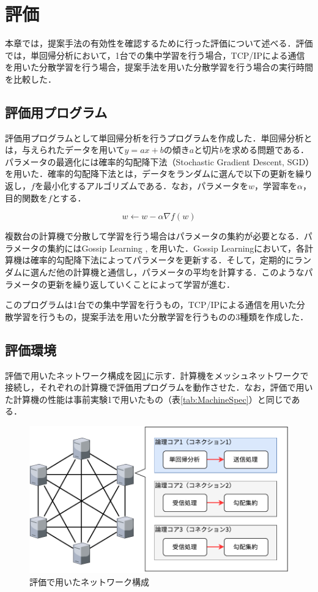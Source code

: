\section{評価}
\label{sec:Evaluation}
本章では，提案手法の有効性を確認するために行った評価について述べる．評価では，単回帰分析において，1台での集中学習を行う場合，TCP/IPによる通信を用いた分散学習を行う場合，提案手法を用いた分散学習を行う場合の実行時間を比較した．

\subsection{評価用プログラム}
評価用プログラムとして単回帰分析を行うプログラムを作成した．単回帰分析とは，与えられたデータを用いて$y = ax + b$の傾き$a$と切片$b$を求める問題である．パラメータの最適化には確率的勾配降下法（Stochastic Gradient Descent, SGD）を用いた．確率的勾配降下法とは，データをランダムに選んで以下の更新を繰り返し，$f$を最小化するアルゴリズムである．なお，パラメータを$w$，学習率を$\alpha$，目的関数を$f$とする．

\begin{equation}
  w \leftarrow w - \alpha \nabla f(w)
\end{equation}

複数台の計算機で分散して学習を行う場合はパラメータの集約が必要となる．パラメータの集約にはGossip Learning \cite{Gossip1}, \cite{Gossip2} を用いた．Gossip Learningにおいて，各計算機は確率的勾配降下法によってパラメータを更新する．そして，定期的にランダムに選んだ他の計算機と通信し，パラメータの平均を計算する．このようなパラメータの更新を繰り返していくことによって学習が進む．

このプログラムは1台での集中学習を行うもの，TCP/IPによる通信を用いた分散学習を行うもの，提案手法を用いた分散学習を行うものの3種類を作成した．

\subsection{評価環境}
評価で用いたネットワーク構成を図\ref{fig:Evaluation}に示す．計算機をメッシュネットワークで接続し，それぞれの計算機で評価用プログラムを動作させた．なお，評価で用いた計算機の性能は事前実験1で用いたもの（表\ref{tab:MachineSpec}）と同じである．

\begin{figure}[htb]
  \centering
  \includegraphics[width=\columnwidth]{pictures/EvaluationNetwork.pdf}
  \caption{評価で用いたネットワーク構成}
  \label{fig:Evaluation}
\end{figure}


